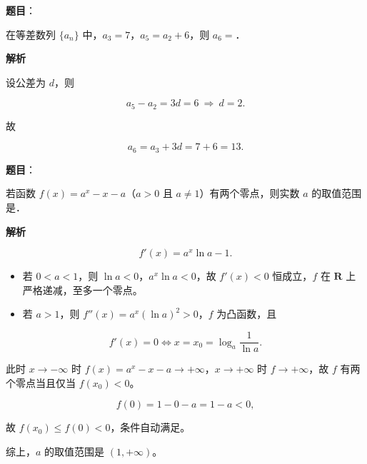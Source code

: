 \begin{answer}

\textbf{题目}：

在等差数列 $\{a_n\}$ 中，$a_3=7$，$a_5=a_2+6$，则 $a_6=$\gkblank{}．

\textbf{解析}

设公差为 $d$，则

\nopagebreak[4]
\[a_5-a_2=3d=6\ \Longrightarrow\ d=2 .\]

故

\nopagebreak[4]
\[a_6=a_3+3d=7+6=13 .\]


\end{answer}
\begin{answer}

\textbf{题目}：

若函数 $f(x)=a^x-x-a$（$a>0$ 且 $a\neq1$）有两个零点，则实数 $a$ 的取值范围是\gkblank{}．

\textbf{解析}

\nopagebreak[4]
\[f'(x)=a^x\ln a-1 .\]

\begin{itemize}
\item 若 $0<a<1$，则 $\ln a<0$，$a^x\ln a<0$，故 $f'(x)<0$ 恒成立，$f$ 在 $\mathbf R$ 上严格递减，至多一个零点。
\item 若 $a>1$，则 $f''(x)=a^x(\ln a)^2>0$，$f$ 为凸函数，且
\end{itemize}

\nopagebreak[4]
\[f'(x)=0\iff x=x_0=\log_a\frac1{\ln a}.\]

此时 $x\to-\infty$ 时 $f(x)=a^x-x-a\to+\infty$，$x\to+\infty$ 时 $f\to+\infty$，故 $f$ 有两个零点当且仅当 $f(x_0)<0$。

\nopagebreak[4]
\[f(0)=1-0-a=1-a<0,\]

故 $f(x_0)\leqslant f(0)<0$，条件自动满足。

综上，$a$ 的取值范围是 $(1,+\infty)$。


\end{answer}
